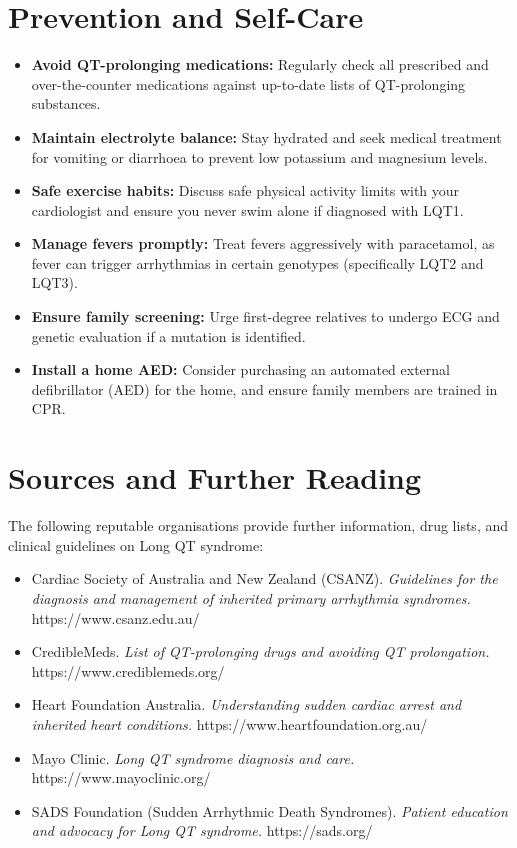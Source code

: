 \section*{Prevention and Self-Care}
\begin{itemize}
    \item \textbf{Avoid QT-prolonging medications:} Regularly check all prescribed and over-the-counter medications against up-to-date lists of QT-prolonging substances.
    \item \textbf{Maintain electrolyte balance:} Stay hydrated and seek medical treatment for vomiting or diarrhoea to prevent low potassium and magnesium levels.
    \item \textbf{Safe exercise habits:} Discuss safe physical activity limits with your cardiologist and ensure you never swim alone if diagnosed with LQT1.
    \item \textbf{Manage fevers promptly:} Treat fevers aggressively with paracetamol, as fever can trigger arrhythmias in certain genotypes (specifically LQT2 and LQT3).
    \item \textbf{Ensure family screening:} Urge first-degree relatives to undergo ECG and genetic evaluation if a mutation is identified.
    \item \textbf{Install a home AED:} Consider purchasing an automated external defibrillator (AED) for the home, and ensure family members are trained in CPR.
\end{itemize}

\section*{Sources and Further Reading}
The following reputable organisations provide further information, drug lists, and clinical guidelines on Long QT syndrome:
\begin{itemize}
    \item Cardiac Society of Australia and New Zealand (CSANZ). \textit{Guidelines for the diagnosis and management of inherited primary arrhythmia syndromes.} https://www.csanz.edu.au/
    \item CredibleMeds. \textit{List of QT-prolonging drugs and avoiding QT prolongation.} https://www.crediblemeds.org/
    \item Heart Foundation Australia. \textit{Understanding sudden cardiac arrest and inherited heart conditions.} https://www.heartfoundation.org.au/
    \item Mayo Clinic. \textit{Long QT syndrome diagnosis and care.} https://www.mayoclinic.org/
    \item SADS Foundation (Sudden Arrhythmic Death Syndromes). \textit{Patient education and advocacy for Long QT syndrome.} https://sads.org/
\end{itemize}
